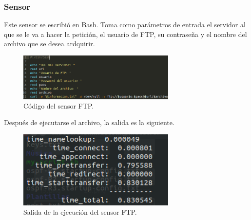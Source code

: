 \subsubsection{Sensor}
Este sensor se escribió en Bash. Toma como parámetros de entrada el servidor al que se le va a hacer la petición, el usuario de FTP, su contraseña y el nombre del archivo que se desea ardquirir.
\begin{figure}[!htbp]
	\hypertarget{fig:sensorFTP}{\hspace{1pt}}
	\begin{center}
		\includegraphics[width=0.7\textwidth]{desarrollo/tarea2/img/sensorFTP.png}
		\caption{Código del sensor FTP.}
		\label{fig:sensorFTP}
	\end{center}
\end{figure}

Después de ejecutarse el archivo, la salida es la siguiente.

\pagebreak
\begin{figure}[!htbp]
	\hypertarget{fig:outputFTP}{\hspace{1pt}}
	\begin{center}
		\includegraphics[width=0.7\textwidth]{desarrollo/tarea2/img/outputFTP.png}
		\caption{Salida de la ejecución del sensor FTP.}
		\label{fig:outputFTP}
	\end{center}
\end{figure}